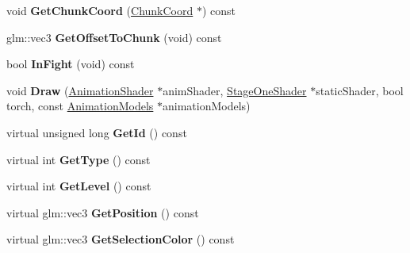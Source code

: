 \begin{DoxyCompactItemize}
\item 
\hypertarget{classplayer_a358865db54f32055a750de403f28d945}{void {\bfseries \-Get\-Chunk\-Coord} (\hyperlink{structChunkCoord}{\-Chunk\-Coord} $\ast$) const }\label{classplayer_a358865db54f32055a750de403f28d945}

\item 
\hypertarget{classplayer_a554d91934bef7aefa2794d1a851a6e0d}{glm\-::vec3 {\bfseries \-Get\-Offset\-To\-Chunk} (void) const }\label{classplayer_a554d91934bef7aefa2794d1a851a6e0d}

\item 
\hypertarget{classplayer_a67fecc1b289a8690966372d1269b21ec}{bool {\bfseries \-In\-Fight} (void) const }\label{classplayer_a67fecc1b289a8690966372d1269b21ec}

\item 
\hypertarget{classplayer_a5d2a8869c20a0ebaeba6dd851e80663e}{void {\bfseries \-Draw} (\hyperlink{classAnimationShader}{\-Animation\-Shader} $\ast$anim\-Shader, \hyperlink{classStageOneShader}{\-Stage\-One\-Shader} $\ast$static\-Shader, bool torch, const \hyperlink{classAnimationModels}{\-Animation\-Models} $\ast$animation\-Models)}\label{classplayer_a5d2a8869c20a0ebaeba6dd851e80663e}

\item 
\hypertarget{classplayer_a960c789b7a8260d5ed03285b580429fb}{virtual unsigned long {\bfseries \-Get\-Id} () const }\label{classplayer_a960c789b7a8260d5ed03285b580429fb}

\item 
\hypertarget{classplayer_ae90dd08c6d30e101c04e3936b0a4c888}{virtual int {\bfseries \-Get\-Type} () const }\label{classplayer_ae90dd08c6d30e101c04e3936b0a4c888}

\item 
\hypertarget{classplayer_af7e76c982912a113ef3c6c55ae488e19}{virtual int {\bfseries \-Get\-Level} () const }\label{classplayer_af7e76c982912a113ef3c6c55ae488e19}

\item 
\hypertarget{classplayer_aa5b3305c0398ed45e66077ae002842e4}{virtual glm\-::vec3 {\bfseries \-Get\-Position} () const }\label{classplayer_aa5b3305c0398ed45e66077ae002842e4}

\item 
\hypertarget{classplayer_a88f97c3a1e051fcca503296f548dcf0c}{virtual glm\-::vec3 {\bfseries \-Get\-Selection\-Color} () const }\label{classplayer_a88f97c3a1e051fcca503296f548dcf0c}


\end{DoxyCompactItemize}
